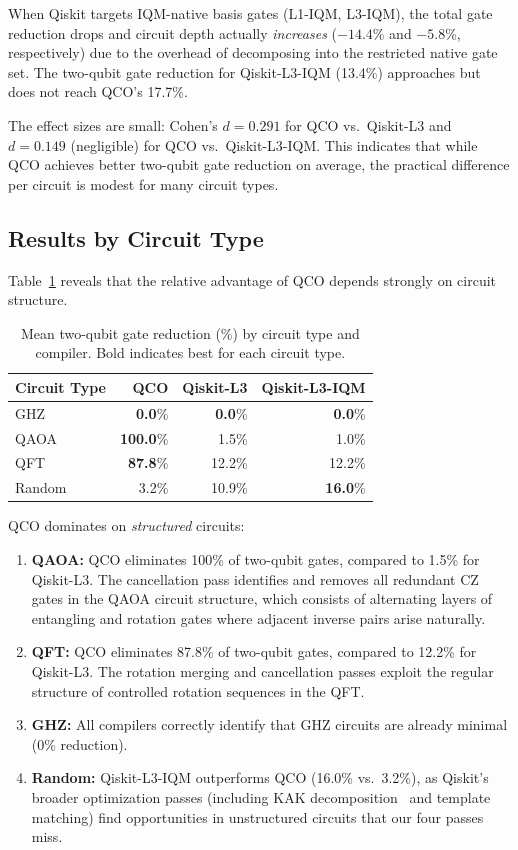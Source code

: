 \documentclass[sigconf,nonacm]{acmart}
\begin{document}
When Qiskit targets IQM-native basis gates (L1-IQM, L3-IQM), the total gate reduction drops and circuit depth actually \emph{increases} ($-14.4$\% and $-5.8$\%, respectively) due to the overhead of decomposing into the restricted native gate set. The two-qubit gate reduction for Qiskit-L3-IQM (13.4\%) approaches but does not reach QCO's 17.7\%.

The effect sizes are small: Cohen's $d = 0.291$ for QCO vs.\ Qiskit-L3 and $d = 0.149$ (negligible) for QCO vs.\ Qiskit-L3-IQM. This indicates that while QCO achieves better two-qubit gate reduction on average, the practical difference per circuit is modest for many circuit types.

\subsection{Results by Circuit Type}

Table~\ref{tab:compiler-type} reveals that the relative advantage of QCO depends strongly on circuit structure.

\begin{table}[t]
\centering
\caption{Mean two-qubit gate reduction (\%) by circuit type and compiler. Bold indicates best for each circuit type.}
\label{tab:compiler-type}
\begin{tabular}{lrrr}
\toprule
\textbf{Circuit Type} & \textbf{QCO} & \textbf{Qiskit-L3} & \textbf{Qiskit-L3-IQM} \\
\midrule
GHZ & \textbf{0.0}\% & \textbf{0.0}\% & \textbf{0.0}\% \\
QAOA & \textbf{100.0}\% & 1.5\% & 1.0\% \\
QFT & \textbf{87.8}\% & 12.2\% & 12.2\% \\
Random & 3.2\% & 10.9\% & \textbf{16.0}\% \\
\bottomrule
\end{tabular}
\end{table}

QCO dominates on \emph{structured} circuits:
\begin{enumerate}
    \item \textbf{QAOA:} QCO eliminates 100\% of two-qubit gates, compared to 1.5\% for Qiskit-L3. The cancellation pass identifies and removes all redundant CZ gates in the QAOA circuit structure, which consists of alternating layers of entangling and rotation gates where adjacent inverse pairs arise naturally.
    \item \textbf{QFT:} QCO eliminates 87.8\% of two-qubit gates, compared to 12.2\% for Qiskit-L3. The rotation merging and cancellation passes exploit the regular structure of controlled rotation sequences in the QFT.
    \item \textbf{GHZ:} All compilers correctly identify that GHZ circuits are already minimal (0\% reduction).
    \item \textbf{Random:} Qiskit-L3-IQM outperforms QCO (16.0\% vs.\ 3.2\%), as Qiskit's broader optimization passes (including KAK decomposition~\cite{vatan2004optimal} and template matching) find opportunities in unstructured circuits that our four passes miss.
\end{enumerate}
\end{document}
